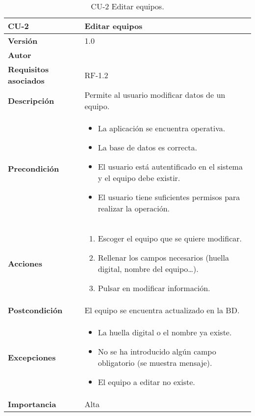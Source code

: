 \begin{table}[p]
	\centering
	\begin{tabularx}{\linewidth}{ p{} p{} }
		\toprule
		\textbf{CU-2}    & \textbf{ Editar equipos}\\
		\toprule
		\textbf{Versión}              & 1.0    \\
		\textbf{Autor}                & \@author{} \\
		\textbf{Requisitos asociados} & RF-1.2\\
		\textbf{Descripción}          & Permite al usuario modificar datos de un equipo. \\
		\textbf{Precondición}         &
		\begin{itemize}
			\tightlist
			\item La aplicación se encuentra operativa.
			\item La base de datos es correcta.
			\item El usuario está autentificado en el sistema y el equipo debe existir.
			\item El usuario tiene suficientes permisos para realizar la operación.
		\end{itemize}\\
		\textbf{Acciones}             &
		\begin{enumerate}
			\tightlist
			\item Escoger el equipo que se quiere modificar.
			\item Rellenar los campos necesarios (huella digital, nombre del equipo\ldots).
			\item Pulsar en modificar información.
		\end{enumerate}\\
		\textbf{Postcondición}        & El equipo se encuentra actualizado en la BD.\\
		\textbf{Excepciones}          &
		\begin{itemize}
			\tightlist
			\item La huella digital o el nombre ya existe.
			\item No se ha introducido algún campo obligatorio (se muestra mensaje).
			\item El equipo a editar no existe.
		\end{itemize}\\
		\textbf{Importancia}          & Alta\\
		\bottomrule
	\end{tabularx}
	\caption{CU-2 Editar equipos.}\label{tab:table-2}
\end{table}

